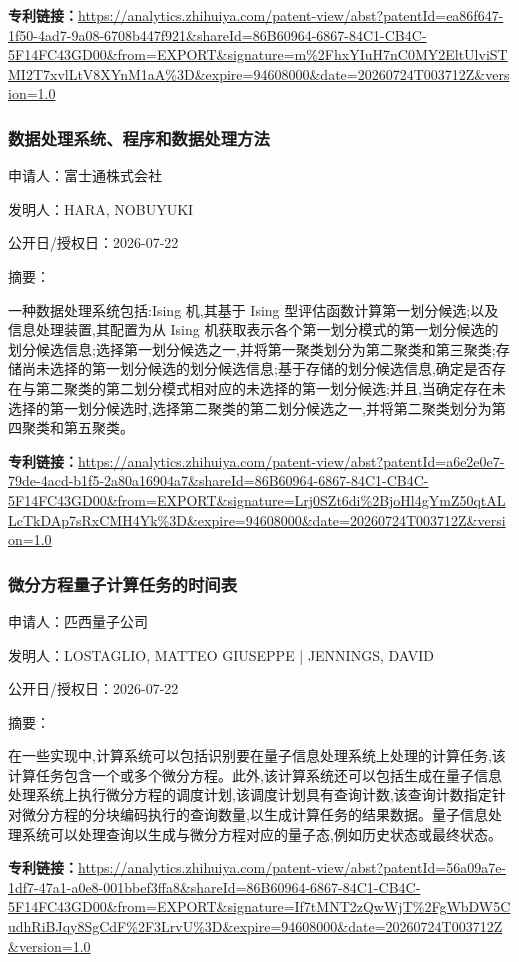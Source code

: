 \documentclass[12pt,a4paper]{ctexart}
\begin{document}
\noindent\textbf{专利链接：}\url{https://analytics.zhihuiya.com/patent-view/abst?patentId=ea86f647-1f50-4ad7-9a08-6708b447f921&shareId=86B60964-6867-84C1-CB4C-5F14FC43GD00&from=EXPORT&signature=m%2FhxYIuH7nC0MY2EltUlviSTMI2T7xvlLtV8XYnM1aA%3D&expire=94608000&date=20260724T003712Z&version=1.0}

\subsubsection{ 数据处理系统、程序和数据处理方法 }

申请人：富士通株式会社

发明人：HARA, NOBUYUKI

公开日/授权日：2026-07-22

摘要：

一种数据处理系统包括:Ising 机,其基于 Ising 型评估函数计算第一划分候选;以及信息处理装置,其配置为从 Ising 机获取表示各个第一划分模式的第一划分候选的划分候选信息;选择第一划分候选之一,并将第一聚类划分为第二聚类和第三聚类;存储尚未选择的第一划分候选的划分候选信息;基于存储的划分候选信息,确定是否存在与第二聚类的第二划分模式相对应的未选择的第一划分候选;并且,当确定存在未选择的第一划分候选时,选择第二聚类的第二划分候选之一,并将第二聚类划分为第四聚类和第五聚类。

\noindent\textbf{专利链接：}\url{https://analytics.zhihuiya.com/patent-view/abst?patentId=a6e2e0e7-79de-4acd-b1f5-2a80a16904a7&shareId=86B60964-6867-84C1-CB4C-5F14FC43GD00&from=EXPORT&signature=Lrj0SZt6di%2BjoHl4gYmZ50qtALLcTkDAp7sRxCMH4Yk%3D&expire=94608000&date=20260724T003712Z&version=1.0}

\subsubsection{ 微分方程量子计算任务的时间表 }

申请人：匹西量子公司

发明人：LOSTAGLIO, MATTEO GIUSEPPE | JENNINGS, DAVID

公开日/授权日：2026-07-22

摘要：

在一些实现中,计算系统可以包括识别要在量子信息处理系统上处理的计算任务,该计算任务包含一个或多个微分方程。此外,该计算系统还可以包括生成在量子信息处理系统上执行微分方程的调度计划,该调度计划具有查询计数,该查询计数指定针对微分方程的分块编码执行的查询数量,以生成计算任务的结果数据。量子信息处理系统可以处理查询以生成与微分方程对应的量子态,例如历史状态或最终状态。

\noindent\textbf{专利链接：}\url{https://analytics.zhihuiya.com/patent-view/abst?patentId=56a09a7e-1df7-47a1-a0e8-001bbef3ffa8&shareId=86B60964-6867-84C1-CB4C-5F14FC43GD00&from=EXPORT&signature=If7tMNT2zQwWjT%2FgWbDW5CudhRiBJqy8SgCdF%2F3LrvU%3D&expire=94608000&date=20260724T003712Z&version=1.0}
\end{document}
